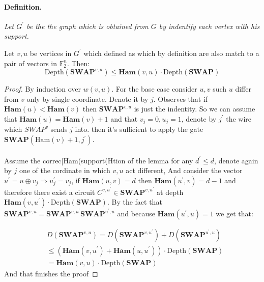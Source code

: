 \documentclass{article}
\begin{document}
\paragraph{Definition.} \textit{ Let $G^\prime$ be the the graph which is obtained from $G$ by indentify each vertex with his support. }
\begin{lemma}  Let \(v,u\) be vertices in \(G^{\prime}\) which defined as   which by definition are also match to a pair of vectors in \(\mathbb{F}_2^{n} \). Then: 
  \begin{equation*}
    \text{Depth}\left(\textbf{SWAP}^{v,u}\right) \le \textbf{Ham}(v,u)\cdot \text{Depth}\left(\textbf{SWAP}\right)
  \end{equation*}
\end{lemma}
\begin{proof} By induction over \(w(v,u)\). For the base case consider \(u,v\) such \(u\) differ from \(v\) only by single coordinate. Denote it by \(j\). Observes that if $\textbf{Ham}(u) <\textbf{Ham}(v)$ then $\textbf{SWAP}^{v,u}$ is just the indentity. So we can assume that $ \textbf{Ham}(u) = \textbf{Ham}(v)+1 $ and that  \(v_j = 0, u_j =1\), denote by \(j^{\prime}\) the wire which \(SWAP^{v}\) sends \(j\) into. then it's sufficient to apply the gate \(\textbf{SWAP}(\text{Ham}(v) +1, j^\prime) \).


  \paragraph{}
  Assume the correc[Ham(support(Htion of the lemma for any \(d^\prime \le d\), denote again by $j$ one of the cordinate in which $v,u$ act different, And consider the vector \(u^\prime = u \oplus v_{j} \Rightarrow u^{\prime}_{j} = v_{j}\), if \( \textbf{Ham}(u,v) = d\) then \( \textbf{Ham}(u^\prime,v) = d-1\) and therefore there exist a circuit \(C^{v,u^\prime}\in \textbf{SWAP}^{v,u^\prime}\) at depth \( \textbf{Ham}(v,u^\prime)\cdot\text{Depth}\left(\textbf{SWAP}\right) \). By the fact that \( \textbf{SWAP}^{v,u} = \textbf{SWAP}^{v,u^\prime} \textbf{SWAP}^{u^\prime,u}     \) and because \( \textbf{Ham}(u^\prime,u) = 1 \) we get that:

	\begin{equation*}
	  \begin{split}
	    & D\left(\textbf{SWAP}^{v,u}\right)  =   D\left(\textbf{SWAP}^{v,u^\prime}\right) + D\left( \textbf{SWAP}^{u^\prime,u} \right) \\ 
	    & \le
	    \left(\textbf{Ham}(v,u^\prime) + \textbf{Ham}(u,u^\prime)\right) \cdot\text{Depth}\left(\textbf{SWAP}\right) \\ & =
	    \textbf{Ham}(v,u) \cdot\text{Depth}\left(\textbf{SWAP}\right) 
	  \end{split}
	\end{equation*}
	And that finishes the proof 
      \end{proof}
\end{document}
